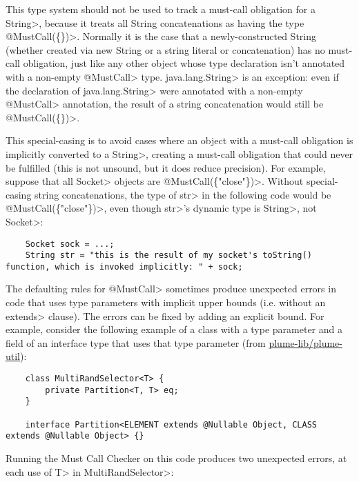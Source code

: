 
This type system should not be used to track a must-call obligation for a \<String>, because it treats all
String concatenations as having the type \<@MustCall(\{\})>.
Normally it is the case that a newly-constructed String (whether created via new String or a string literal
or concatenation) has no must-call obligation, just like any other object whose type declaration isn't annotated with a
non-empty \<@MustCall> type. \<java.lang.String> is an exception: even if the declaration of \<java.lang.String> were
annotated with a non-empty \<@MustCall> annotation, the result of a string concatenation would still be \<@MustCall(\{\})>.

This special-casing is to avoid cases where
an object with a must-call obligation is implicitly converted to a \<String>, creating a must-call obligation
that could never be fulfilled (this is not unsound, but it does reduce precision). For example, suppose that
all \<Socket> objects are \<@MustCall(\{"close"\})>. Without special-casing string concatenations, the type of
\<str> in the following code would be \<@MustCall(\{"close"\})>, even though \<str>'s dynamic type is \<String>, not
\<Socket>:
\begin{Verbatim}
    Socket sock = ...;
    String str = "this is the result of my socket's toString() function, which is invoked implicitly: " + sock;
\end{Verbatim}


The defaulting rules for \<@MustCall> sometimes produce unexpected errors in code
that uses type parameters with implicit upper bounds (i.e. without an \<extends> clause).
The errors can be fixed by adding an explicit bound. For example, consider the following
example of a class with a type parameter and a field of an interface type that uses that
type parameter (from \href{https://github.com/plume-lib/plume-util}{plume-lib/plume-util}):
\begin{Verbatim}
    class MultiRandSelector<T> {
        private Partition<T, T> eq;
    }

    interface Partition<ELEMENT extends @Nullable Object, CLASS extends @Nullable Object> {}
\end{Verbatim}

Running the Must Call Checker on this code produces two unexpected errors, at each use
of \<T> in \<MultiRandSelector>:

